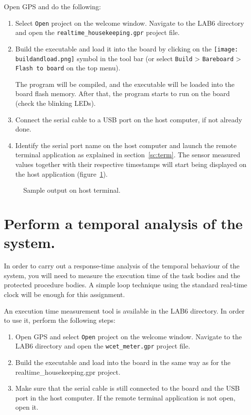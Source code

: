 Open GPS and do the following:
\begin{enumerate}
\item Select {\tt Open} project on the welcome window. Navigate to the LAB6 directory and open the {\tt realtime\_housekeeping.gpr} project file.
\item Build the executable and load it into the board by clicking on the \hbox{\texttt{[image: buildandload.png]}} symbol in the tool bar (or select {\tt Build} > {\tt Bareboard} > {\tt Flash to board} on the top menu).

The program will be compiled, and the executable will be loaded into the board flash memory. After that, the program starts to run on the board (check the blinking LEDs).
\item Connect the serial cable to a USB port on the host computer, if not already done.
\item Identify the serial port name on the host computer and launch the remote terminal application as explained in section~\ref{sc:term}.  The sensor measured values together with their respective timestamps will start being displayed on the host application (figure~\ref{fig:output}).
\end{enumerate}

\begin{figure}[h]
            \caption{Sample output on host terminal.}
            \label{fig:output}
\end{figure}

\section{Perform a temporal analysis of the system.}\label{sc:ta}

In order to carry out a response-time analysis of the temporal behaviour of the system, you will need to measure the execution time of the task bodies and the protected procedure bodies. A simple loop technique using the standard real-time clock will be enough for this assignment.

An execution time measurement tool is available in the LAB6 directory. In order to use it, perform the following steps:
\begin{enumerate}
\item Open GPS and select {\tt Open} project on the welcome window. Navigate to the LAB6 directory and open the {\tt wcet\_meter.gpr} project file.
\item Build the executable and load into the board in the same way as for the realtime\_housekeeping.gpr project.
\item Make sure that the serial cable is still connected to the board and the USB port in the host computer. If the remote terminal application is not open, open it.
\end{enumerate}


